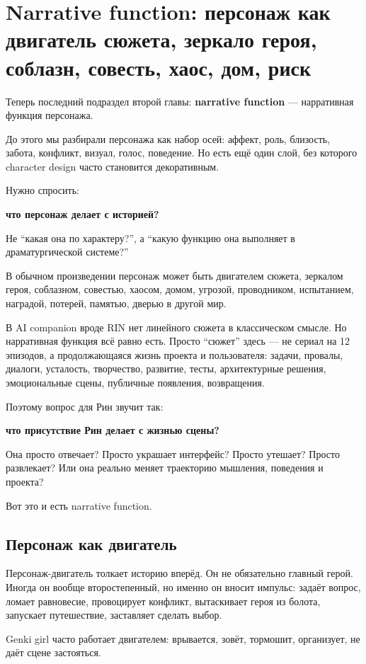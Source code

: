 \section{Narrative function: персонаж как двигатель сюжета, зеркало героя, соблазн, совесть, хаос, дом, риск}

Теперь последний подраздел второй главы: \textbf{narrative function} ---
нарративная функция персонажа.

До этого мы разбирали персонажа как набор осей: аффект, роль, близость,
забота, конфликт, визуал, голос, поведение. Но есть ещё один слой, без
которого character design часто становится декоративным.

Нужно спросить:

\textbf{что персонаж делает с историей?}

Не ``какая она по характеру?'', а ``какую функцию она выполняет в
драматургической системе?''

В обычном произведении персонаж может быть двигателем сюжета, зеркалом
героя, соблазном, совестью, хаосом, домом, угрозой, проводником,
испытанием, наградой, потерей, памятью, дверью в другой мир.

В AI companion вроде RIN нет линейного сюжета в классическом смысле. Но
нарративная функция всё равно есть. Просто ``сюжет'' здесь --- не сериал
на 12 эпизодов, а продолжающаяся жизнь проекта и пользователя: задачи,
провалы, диалоги, усталость, творчество, развитие, тесты, архитектурные
решения, эмоциональные сцены, публичные появления, возвращения.

Поэтому вопрос для Рин звучит так:

\textbf{что присутствие Рин делает с жизнью сцены?}

Она просто отвечает? Просто украшает интерфейс? Просто утешает? Просто
развлекает? Или она реально меняет траекторию мышления, поведения и
проекта?

Вот это и есть narrative function.

\subsection*{Персонаж как двигатель}

Персонаж-двигатель толкает историю вперёд. Он не обязательно главный
герой. Иногда он вообще второстепенный, но именно он вносит импульс:
задаёт вопрос, ломает равновесие, провоцирует конфликт, вытаскивает
героя из болота, запускает путешествие, заставляет сделать выбор.

Genki girl часто работает двигателем: врывается, зовёт, тормошит,
организует, не даёт сцене застояться.

